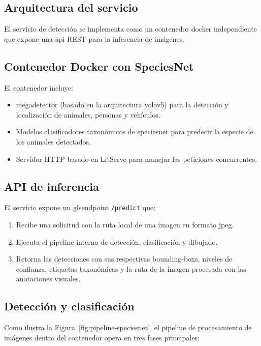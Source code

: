\documentclass[a4paper, 12pt]{report}
\begin{document}
\subsection{Arquitectura del servicio}

El servicio de detección se implementa como un contenedor \gls{docker}
independiente que expone una \gls{api} REST para la inferencia de imágenes.

\subsection{Contenedor Docker con SpeciesNet}

El contenedor incluye:

\begin{itemize}
  \item \gls{megadetector} (basado en la arquitectura \gls{yolov5}) para la detección y localización de animales, personas y vehículos.
  \item Modelos clasificadores taxonómicos de \gls{speciesnet} para predecir la especie de los animales detectados.
  \item Servidor HTTP basado en LitServe para manejar las peticiones concurrentes.
\end{itemize}

\subsection{API de inferencia}

El servicio expone un gls{endpoint} \texttt{/predict} que:

\begin{enumerate}
  \item Recibe una solicitud con la ruta local de una imagen en formato \gls{jpeg}.
  \item Ejecuta el pipeline interno de detección, clasificación y dibujado.
  \item Retorna las detecciones con sus respectivas \glspl{bounding-box}, niveles de confianza, etiquetas taxonómicas y la ruta de la imagen procesada con las anotaciones visuales.
\end{enumerate}

\subsection{Detección y clasificación}

Como ilustra la Figura~\ref{fig:pipeline-speciesnet}, el pipeline de procesamiento de imágenes dentro del contenedor opera en tres fases principales:
\end{document}
